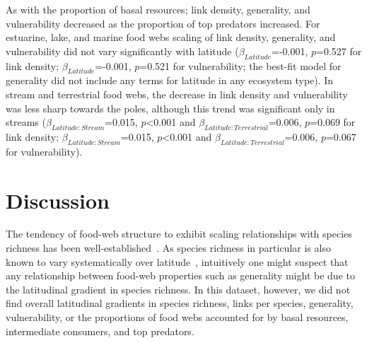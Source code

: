 \documentclass[12pt]{article}
\begin{document}
\begin{spacing}{1.0}
    As with the proportion of basal resources; link density, generality, and
    vulnerability decreased as the proportion of top predators increased. For
    estuarine, lake, and marine food webs scaling of link density, generality, and
    vulnerability did not vary significantly with latitude
    ($\beta_{Latitude}$=-0.001, $p$=0.527 for link density;
    $\beta_{Latitude}$=-0.001, $p$=0.521 for vulnerability; the best-fit model for
    generality did not include any terms for latitude in any ecosystem type). In
    stream and terrestrial food webs, the decrease in link density and
    vulnerability was less sharp towards the poles, although this trend was
    significant only in streams ($\beta_{Latitude:Stream}$=0.015,
    $p$\textless0.001 and $\beta_{Latitude:Terrestrial}$=0.006, $p$=0.069 for link
    density; $\beta_{Latitude:Stream}$=0.015, $p$\textless0.001 and
    $\beta_{Latitude:Terrestrial}$=0.006, $p$=0.067 for vulnerability).



\section*{Discussion}

  The tendency of food-web structure to exhibit scaling relationships with
  species richness has been well-established~\citep{Dunne2004,Riede2010}. As
  species richness in particular is also known to vary systematically over
  latitude~\citep{Schemske2009a,Macpherson2002,Kaufman1995}, intuitively one might suspect that any relationship
  between food-web properties such as generality might be due to the latitudinal
  gradient in species richness. In this dataset, however, we did not find
  overall latitudinal gradients in species richness, links per species, 
  generality, vulnerability, or the proportions of food webs accounted for by 
  basal resources, intermediate consumers, and top predators. 



\end{spacing}
\end{document}
